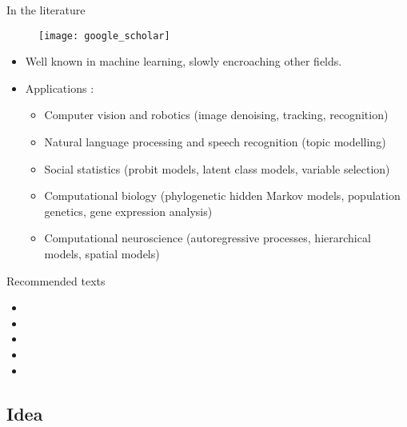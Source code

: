 \begin{frame}{In the literature}
  \vspace{-12pt}
  \begin{figure}[h]
    \texttt{[image: google\_scholar]}
  \end{figure}
  \vspace{-15pt}
  \begin{itemize}
    \item Well known in machine learning, slowly encroaching other fields.
    \pause
    \item Applications \citep{blei2017variational}:
    \begin{itemize}\footnotesize
      \item Computer vision and robotics {\color{gray!65}(image denoising, tracking, recognition)}   
      \item Natural language processing and speech recognition {\color{gray!65}(topic modelling)}
      \item Social statistics {\color{gray!65}(probit models, latent class models, variable selection)}   
      \item Computational biology {\color{gray!65}(phylogenetic hidden Markov models, population genetics, gene expression analysis)}
      \item Computational neuroscience {\color{gray!65}(autoregressive processes, hierarchical models, spatial models)}
    \end{itemize}
  \end{itemize}
\end{frame}

\begin{frame}{Recommended texts}
  \begin{itemize}
    \item {}
    \item {}
    \item {}
    \item {}
    \item {}
  \end{itemize}
\end{frame}

\subsection{Idea}

